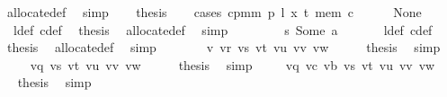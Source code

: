 \begin{isabellebody}
\ allocate{\isacharunderscore}{\kern0pt}def\ \isamarkupfalse%
\ simp\isanewline
\ \ \isamarkupfalse%
\ {\isacharquery}{\kern0pt}thesis\isanewline
\ \ \isamarkupfalse%
\ {\isacharparenleft}{\kern0pt}cases\ {\isachardoublequoteopen}cpm{}m\ p\ l\ x\ t\ mem\ c{\isacharprime}{\kern0pt}{\isachardoublequoteclose}{\isacharparenright}{\kern0pt}\isanewline
\ \ \ \ \isamarkupfalse%
\ None\isanewline
\ \ \ \ \isamarkupfalse%
\ {}{}\ l{\isacharunderscore}{\kern0pt}def\ c{\isacharunderscore}{\kern0pt}def\ \isamarkupfalse%
\ {\isacharquery}{\kern0pt}thesis\ \isamarkupfalse%
\ allocate{\isacharunderscore}{\kern0pt}def\ \isamarkupfalse%
\ simp\isanewline
\ \ \isamarkupfalse%
\isanewline
\ \ \ \ \isamarkupfalse%
\ s{}{\isacharcolon}{\kern0pt}\ {\isacharparenleft}{\kern0pt}Some\ a{\isacharparenright}{\kern0pt}\isanewline
\ \ \ \ \isamarkupfalse%
\ {}{}\ l{\isacharunderscore}{\kern0pt}def\ c{\isacharunderscore}{\kern0pt}def\ \isamarkupfalse%
\ {\isacharquery}{\kern0pt}thesis\ \isamarkupfalse%
\ allocate{\isacharunderscore}{\kern0pt}def\ \isamarkupfalse%
\ simp\isanewline
\ \ \isamarkupfalse%
\isanewline
{}\isamarkupfalse%
\isanewline
\ \ \isamarkupfalse%
\ {\isacharparenleft}{\kern0pt}{}{}\ v\ vr\ vs\ vt\ vu\ vv\ vw{\isacharparenright}{\kern0pt}\isanewline
\ \ \isamarkupfalse%
\ \isamarkupfalse%
\ {\isacharquery}{\kern0pt}thesis\ \isamarkupfalse%
\ simp\isanewline
{}\isamarkupfalse%
\isanewline
\ \ \isamarkupfalse%
\ {\isacharparenleft}{\kern0pt}{}{}\ vq\ vs\ vt\ vu\ vv\ vw{\isacharparenright}{\kern0pt}\isanewline
\ \ \isamarkupfalse%
\ \isamarkupfalse%
\ {\isacharquery}{\kern0pt}thesis\ \isamarkupfalse%
\ simp\isanewline
{}\isamarkupfalse%
\isanewline
\ \ \isamarkupfalse%
\ {\isacharparenleft}{\kern0pt}{}{}\ vq\ vc\ vb\ vs\ vt\ vu\ vv\ vw{\isacharparenright}{\kern0pt}\isanewline
\ \ \isamarkupfalse%
\ \isamarkupfalse%
\ {\isacharquery}{\kern0pt}thesis\ \isamarkupfalse%
\ simp\isanewline
{}\isamarkupfalse%
\isanewline
\ \ \isamarkupfalse%

\end{isabellebody}
